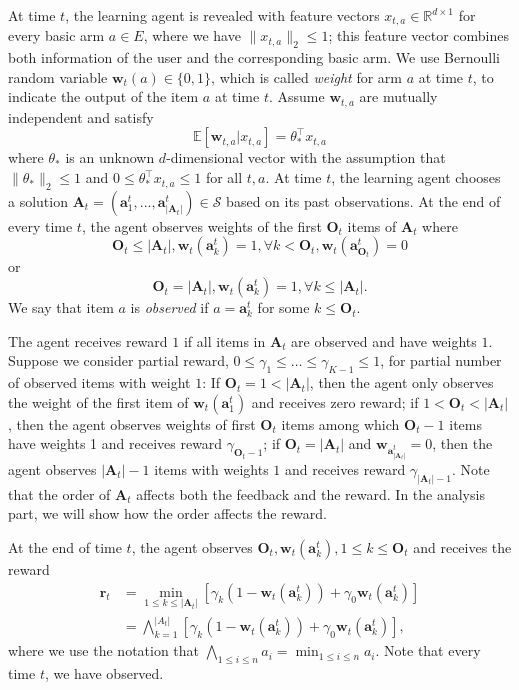 \documentclass{article}
\newcommand{\EE}{\mathbb{E}}
\newcommand{\RR}{\mathbb{R}}
\newcommand{\bA}{\mathbf{A}}
\newcommand{\ba}{\mathbf{a}}
\newcommand{\bO}{\mathbf{O}}
\newcommand{\br}{\mathbf{r}}
\newcommand{\bw}{\mathbf{w}}
\newcommand{\cS}{\mathcal{S}}
\newcommand{\abs}[1]{\left| #1 \right|}
\newcommand{\norm}[1]{\| #1 \|}
\begin{document}
At time $t$, the learning agent is revealed with feature vectors $x_{t,a} \in \RR^{d \times 1}$ for every basic arm $a \in E$, where we have $\norm{x_{t,a}}_2 \leq 1$; this feature vector combines both information of the user and the corresponding basic arm. We use Bernoulli random variable $\bw_{t}(a) \in \{0,1\}$, which is called {\it weight} for arm $a$ at time $t$, to indicate the output of the item $a$ at time $t$. Assume $\bw_{t,a}$ are mutually independent and satisfy
\begin{equation}
\label{eq:expectation}
\EE[\bw_{t,a} | x_{t,a}] = \theta_*^{\top} x_{t,a}
\end{equation}
where $\theta_*$ is an unknown $d$-dimensional vector with the assumption that $\norm{\theta_*}_2 \leq 1$ and $0 \leq \theta_*^{\top} x_{t,a} \leq 1$ for all $t, a$. At time $t$, the learning agent chooses a solution $\bA_t=(\ba_{1}^t,...,\ba_{\abs{\bA_t}}^t) \in \cS$ based on its past observations. At the end of every time $t$, the agent observes weights of the first $\bO_t$ items of $\bA_t$ where 
$$
\bO_t \leq \abs{\bA_t}, \bw_t(\ba_k^t) = 1, \forall k < \bO_t, \bw_t(\ba_{\bO_t}^t) = 0
$$ 
or 
$$
\bO_t = \abs{\bA_t}, \bw_t(\ba_k^t) = 1, \forall k \leq \abs{\bA_t}.
$$
We say that item $a$ is {\it observed} if $a = \ba_k^t$ for some $k \leq \bO_t$. 

The agent receives reward $1$ if all items in $\bA_t$ are observed and have weights $1$. Suppose we consider partial reward, $0 \leq \gamma_1 \leq \ldots \leq \gamma_{K-1} \leq 1$, for partial number of observed items with weight $1$: If $\bO_t = 1 < \abs{\bA_t}$, then the agent only observes the weight of the first item of $\bw_t(\ba_1^t)$ and receives zero reward; if $1 < \bO_t < \abs{\bA_t}$, then the agent observes weights of first $\bO_t$ items among which $\bO_t - 1$ items have weights 1 and receives reward $\gamma_{\bO_t - 1}$; if $\bO_t = \abs{\bA_t}$ and $\bw_{\ba_{\abs{\bA_t}}^t} = 0$, then the agent observes $\abs{\bA_t} - 1$ items with weights $1$ and receives reward $\gamma_{\abs{\bA_t} - 1}$. Note that the order of $\bA_t$ affects both the feedback and the reward. In the analysis part, we will show how the order affects the reward.

At the end of time $t$, the agent observes $\bO_t, \bw_t(\ba_k^t), 1\leq k\leq\bO_t$ and receives the reward
\begin{align*}
\br_t &= \min_{1 \leq k \leq \abs{\bA_t}} [\gamma_k (1 - \bw_t(\ba_k^t)) +\gamma_0 \bw_t(\ba_k^t)] \\
&= \bigwedge_{k=1}^{\abs{A_t}} [\gamma_k (1 - \bw_t(\ba_k^t)) +\gamma_0 \bw_t(\ba_k^t)],
\end{align*}
where we use the notation that $\bigwedge_{1\leq i\leq n}a_i = \min_{1\leq i\leq n}a_i$. Note that every time $t$, we have observed. 
	
\end{document}
